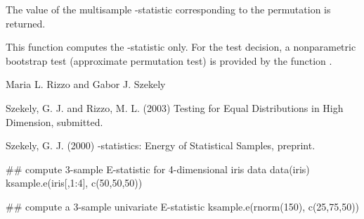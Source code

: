 \documentclass{article}
\begin{document}
\begin{Value}
The value of the multisample -statistic corresponding to
the permutation  is returned.\end{Value}
\begin{Note}\relax
This function computes the -statistic only. 
For the test decision,
a nonparametric bootstrap test (approximate permutation test)
is provided by the function .
\end{Note}
\begin{Author}\relax
Maria L. Rizzo  and
Gabor J. Szekely 
\end{Author}
\begin{References}\relax
Szekely, G. J. and Rizzo, M. L. (2003) Testing for Equal
Distributions in High Dimension, submitted.

Szekely, G. J. (2000) -statistics: Energy of 
Statistical Samples, preprint.\end{References}
\begin{SeeAlso}\relax
{}
\end{SeeAlso}
\begin{Examples}
\begin{ExampleCode}
## compute 3-sample E-statistic for 4-dimensional iris data
 data(iris)
 ksample.e(iris[,1:4], c(50,50,50))

## compute a 3-sample univariate E-statistic
 ksample.e(rnorm(150), c(25,75,50))
\end{ExampleCode}
\end{Examples}
\end{document}
